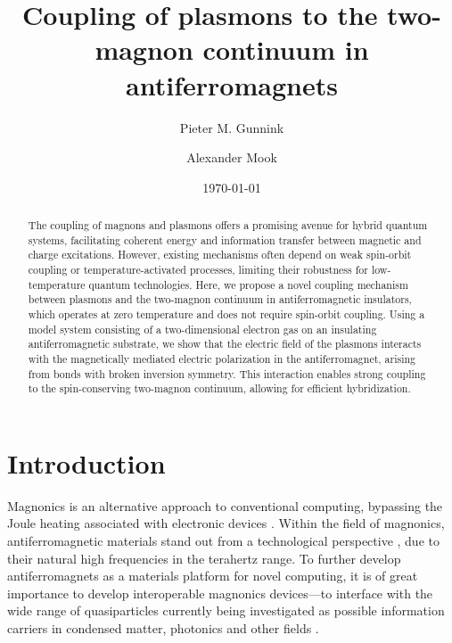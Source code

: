 \documentclass[aps,prb,reprint,twocolumns,superscriptaddress,nofootinbib]{revtex4-2}
\begin{document}
	\title{Coupling of plasmons to the two-magnon continuum in antiferromagnets}
	\date{\today}
	
	\author{Pieter M. Gunnink}
	\author{Alexander Mook}
	\begin{abstract}   
		The coupling of magnons and plasmons offers a promising avenue for hybrid quantum systems, facilitating coherent energy and information transfer between magnetic and charge excitations. However, existing mechanisms often depend on weak spin-orbit coupling or temperature-activated processes, limiting their robustness for low-temperature quantum technologies. Here, we propose a novel coupling mechanism between plasmons and the two-magnon continuum in antiferromagnetic insulators, which operates at zero temperature and does not require spin-orbit coupling. Using a model system consisting of a two-dimensional electron gas on an insulating antiferromagnetic substrate, we show that the electric field of the plasmons interacts with the magnetically mediated electric polarization in the antiferromagnet, arising from bonds with broken inversion symmetry. This interaction enables strong coupling to the spin-conserving two-magnon continuum, allowing for efficient hybridization.
	\end{abstract}
	
	\maketitle
	
	
	
	\section{Introduction}
	
	Magnonics is an alternative approach to conventional computing, bypassing the Joule heating associated with electronic devices \cite{flebus2024MagnonicsRoadmap2024}. Within the field of magnonics, antiferromagnetic materials stand out from a technological perspective \cite{baltzAntiferromagneticSpintronics2018}, due to their natural high frequencies in the terahertz range. To further develop antiferromagnets as a materials platform for novel computing, it is of great importance to develop interoperable magnonics devices---to interface with the wide range of quasiparticles currently being investigated as possible information carriers in condensed matter, photonics and other fields \cite{zarerameshtiCavityMagnonics2022,yuanQuantumMagnonicsWhen2022,chumakMagnonSpintronics2015}. 
	
\end{document}
